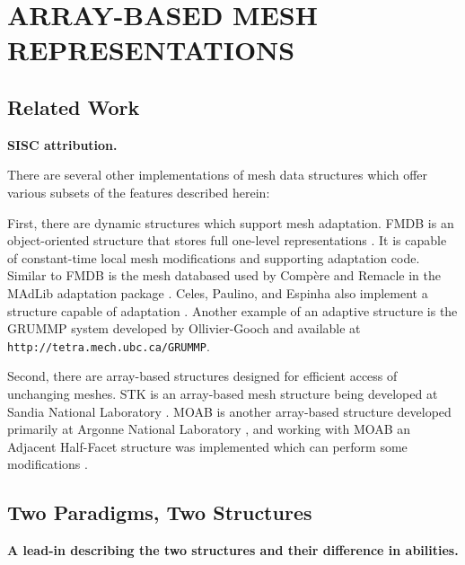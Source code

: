 
\chapter{ARRAY-BASED MESH REPRESENTATIONS}
\label{chap:struct}

\section{Related Work}

{\bf SISC attribution.}

There are several other implementations of mesh data structures
which offer various subsets of the features described herein:

First, there are dynamic structures which support mesh adaptation.
FMDB is an object-oriented structure that
stores full one-level representations \cite{seol2006efficient}.
It is capable of constant-time local
mesh modifications and supporting adaptation code.
Similar to FMDB is the mesh databased used by Comp\`{e}re and Remacle
in the MAdLib adaptation package \cite{compere2010mesh}.
Celes, Paulino, and Espinha also implement a structure capable of
adaptation \cite{celes2005compact}.
Another example of an adaptive structure
is the GRUMMP system developed by Ollivier-Gooch
and available at \texttt{http://tetra.mech.ubc.ca/GRUMMP}.

Second, there are array-based structures designed for
efficient access of unchanging meshes.
STK is an array-based mesh structure being developed at
Sandia National Laboratory \cite{edwards2010sierra}.
MOAB is another array-based structure developed primarily
at Argonne National Laboratory \cite{tautges_moab:_2004},
and working with MOAB an Adjacent Half-Facet structure
was implemented which can perform some modifications \cite{dyedov2014ahf}.

\section{Two Paradigms, Two Structures}
\label{sec:two_codes}

{\bf A lead-in describing the two structures and their difference
in abilities.}

